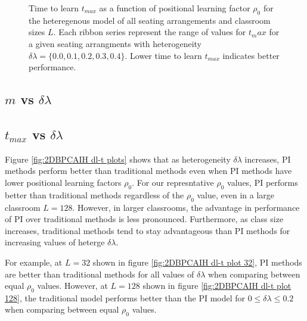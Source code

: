 \begin{figure}[htbp!]
    \caption{Time to learn $t_{max}$ as a function of positional learning factor $\rho_0$ for the heteregenous model of all seating arrangements and classroom sizes $L$. 
    Each ribbon series represent the range of values for $t_max$ for a given seating arrangments with heterogeneity $\delta\lambda = \lbrace 0.0, 0.1, 0.2, 0.3, 0.4 \rbrace$.
    Lower time to learn $t_{max}$ indicates better performance.
    }
    \label{fig:2DBPCAIH t-rho ribbon plot}
 \end{figure}

 \newpage %

\subsection{$m$ vs $\delta\lambda$}\label{subsec:BPCAIH m vs dl}

\subsection{$t_{max}$ vs $\delta\lambda$}\label{subsec:BPCAIH t vs dl}

Figure \ref{fig:2DBPCAIH dl-t plots} shows that as heterogeneity $\delta\lambda$ increases, PI methods perform better than traditional methods even when PI methods have lower positional learning factors $\rho_0$. For our represntative $\rho_0$ values, PI performs better than traditional methods regardless of the $\rho_0$ value, even in a large classroom $L=128$. 
However, in larger classrooms, the advantage in performance of PI over traditional methods is less pronounced. 
Furthermore, as class size increases, traditional methods tend to stay advantageous than PI methods for increasing values of heterge $\delta\lambda$.

For example, at $L=32$ shown in figure \ref{fig:2DBPCAIH dl-t plot 32}, PI methods are better than traditional methods for all values of $\delta\lambda$ when comparing between equal $\rho_0$ values. 
However, at $L=128$ shown in figure \ref{fig:2DBPCAIH dl-t plot 128}, the traditional model performs better than the PI model for $0 \leq \delta\lambda \leq 0.2$ when comparing between equal $\rho_0$ values.

